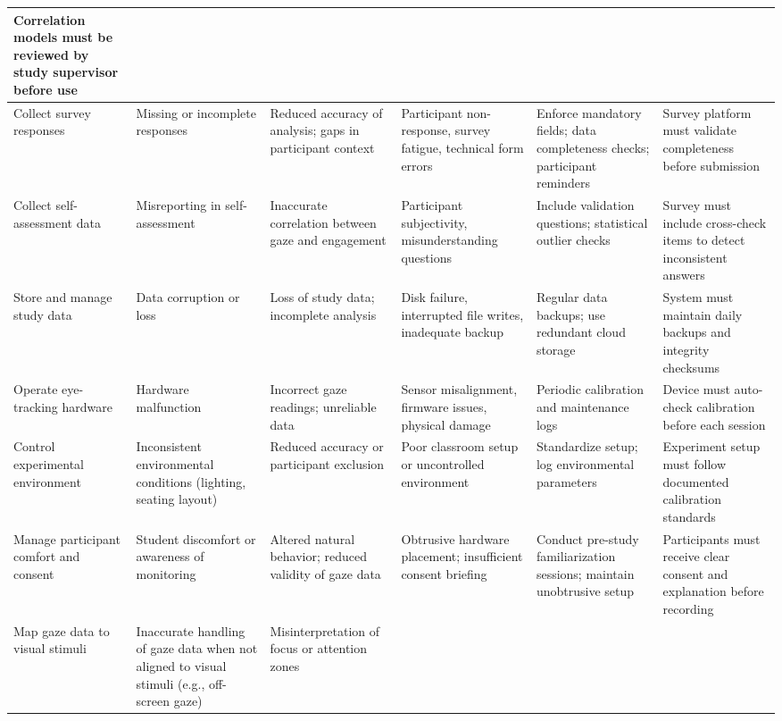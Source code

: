 \documentclass{article}
\begin{document}
\begin{table}[htbp]
{\begin{tabularx}{\textwidth}{|Y|Y|Y|Y|Y|Y|}
      Correlation models must be reviewed by study supervisor before use \\
      \hline
      Collect survey responses & Missing or incomplete responses &
      Reduced accuracy of analysis; gaps in participant context &
      Participant non-response, survey fatigue, technical form errors &
      Enforce mandatory fields; data completeness checks; participant reminders &
      Survey platform must validate completeness before submission \\
      \hline
      Collect self-assessment data & Misreporting in self-assessment &
      Inaccurate correlation between gaze and engagement &
      Participant subjectivity, misunderstanding questions &
      Include validation questions; statistical outlier checks &
      Survey must include cross-check items to detect inconsistent answers \\
      \hline
      Store and manage study data & Data corruption or loss &
      Loss of study data; incomplete analysis &
      Disk failure, interrupted file writes, inadequate backup &
      Regular data backups; use redundant cloud storage &
      System must maintain daily backups and integrity checksums \\
      \hline
      Operate eye-tracking hardware & Hardware malfunction & 
      Incorrect gaze readings; unreliable data &
      Sensor misalignment, firmware issues, physical damage &
      Periodic calibration and maintenance logs &
      Device must auto-check calibration before each session \\
      \hline
      Control experimental environment & Inconsistent environmental conditions (lighting, seating layout) &
      Reduced accuracy or participant exclusion &
      Poor classroom setup or uncontrolled environment &
      Standardize setup; log environmental parameters &
      Experiment setup must follow documented calibration standards \\
      \hline
      Manage participant comfort and consent & Student discomfort or awareness of monitoring &
      Altered natural behavior; reduced validity of gaze data &
      Obtrusive hardware placement; insufficient consent briefing &
      Conduct pre-study familiarization sessions; maintain unobtrusive setup &
      Participants must receive clear consent and explanation before recording \\
      \hline
      Map gaze data to visual stimuli & Inaccurate handling of gaze data when not aligned to visual stimuli (e.g., off-screen gaze) &
      Misinterpretation of focus or attention zones &

\end{tabularx}}
\end{table}
\end{document}
